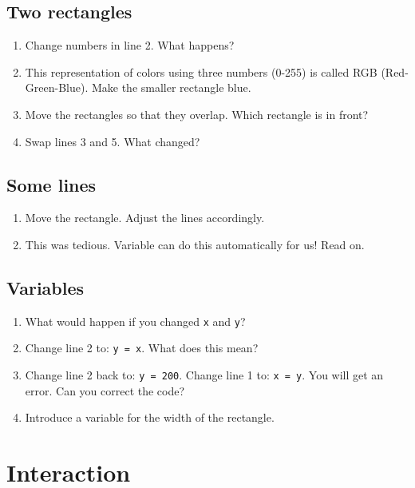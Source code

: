 \documentclass[a4paper, 11pt]{article}
\begin{document}
\subsection{Two rectangles}



\begin{enumerate} 
\item Change numbers in line 2. What happens?
\item This representation of colors using three numbers (0-255) is called RGB (Red-Green-Blue). Make the smaller rectangle blue. 
\item Move the rectangles so that they overlap. Which rectangle is in front?
\item Swap lines 3 and 5. What changed?
\end{enumerate}

\subsection{Some lines}



\begin{enumerate} 
\item Move the rectangle. Adjust the lines accordingly.
\item This was tedious. Variable can do this automatically for us! Read on.
\end{enumerate}

\subsection{Variables}



\begin{enumerate} 
\item What would happen if you changed \texttt{x} and \texttt{y}?
\item Change line 2 to: \texttt{y = x}. What does this mean?
\item Change line 2 back to: \texttt{y = 200}. Change line 1 to: \texttt{x = y}. You will get an error. Can you correct the code?
\item Introduce a variable for the width of the rectangle.
\end{enumerate}

\section{Interaction}
\end{document}

